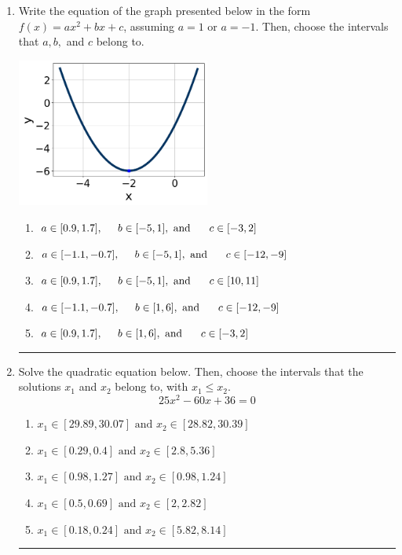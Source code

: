 \documentclass[14pt]{extbook}
\newcommand{\litem}[1]{\item#1\hspace*{-1cm}\rule{\textwidth}{0.4pt}}
\begin{document}
\begin{enumerate}
{\begin{enumerate}[label=\Alph*.]
\end{enumerate} }
\litem{
Write the equation of the graph presented below in the form $f(x)=ax^2+bx+c$, assuming  $a=1$ or $a=-1$. Then, choose the intervals that $a, b,$ and $c$ belong to.
\begin{center}
    \includegraphics[width=0.5\textwidth]{../Figures/quadraticGraphToEquationC.png}
\end{center}
\begin{enumerate}[label=\Alph*.]
\item \( a \in [0.9, 1.7], \hspace*{5mm} b \in [-5, 1], \text{ and } \hspace*{5mm} c \in [-3, 2] \)
\item \( a \in [-1.1, -0.7], \hspace*{5mm} b \in [-5, 1], \text{ and } \hspace*{5mm} c \in [-12, -9] \)
\item \( a \in [0.9, 1.7], \hspace*{5mm} b \in [-5, 1], \text{ and } \hspace*{5mm} c \in [10, 11] \)
\item \( a \in [-1.1, -0.7], \hspace*{5mm} b \in [1, 6], \text{ and } \hspace*{5mm} c \in [-12, -9] \)
\item \( a \in [0.9, 1.7], \hspace*{5mm} b \in [1, 6], \text{ and } \hspace*{5mm} c \in [-3, 2] \)

\end{enumerate} }
\litem{
Solve the quadratic equation below. Then, choose the intervals that the solutions $x_1$ and $x_2$ belong to, with $x_1 \leq x_2$.\[ 25x^{2} -60 x + 36 = 0 \]\begin{enumerate}[label=\Alph*.]
\item \( x_1 \in [29.89, 30.07] \text{ and } x_2 \in [28.82, 30.39] \)
\item \( x_1 \in [0.29, 0.4] \text{ and } x_2 \in [2.8, 5.36] \)
\item \( x_1 \in [0.98, 1.27] \text{ and } x_2 \in [0.98, 1.24] \)
\item \( x_1 \in [0.5, 0.69] \text{ and } x_2 \in [2, 2.82] \)
\item \( x_1 \in [0.18, 0.24] \text{ and } x_2 \in [5.82, 8.14] \)


\end{enumerate}}
\end{enumerate}
\end{document}
